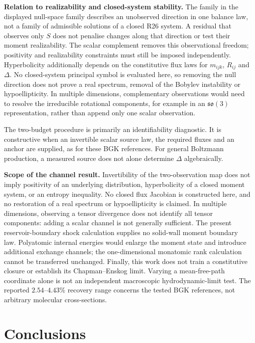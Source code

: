 \documentclass[lineno,paper]{JFM-FLM_Au}
\newenvironment{revision}{\begingroup\colorlet{shadecolor}{revisionyellow}\begin{shaded}}{\end{shaded}\endgroup}
\newenvironment{revision}{}{}
\begin{document}
\begin{revision}
\textbf{Relation to realizability and closed-system stability.} The family in the displayed null-space family describes an unobserved direction in one balance law, not a family of admissible solutions of a closed R26 system. A residual that observes only $S$ does not penalise changes along that direction or test their moment realizability. The scalar complement removes this observational freedom; positivity and realizability constraints must still be imposed independently. Hyperbolicity additionally depends on the constitutive flux laws for $m_{ijk}$, $R_{ij}$ and $\Delta$. No closed-system principal symbol is evaluated here, so removing the null direction does not prove a real spectrum, removal of the Bobylev instability or hypoellipticity. In multiple dimensions, complementary observations would need to resolve the irreducible rotational components, for example in an $\mathfrak{so}(3)$ representation, rather than append only one scalar observation.

The two-budget procedure is primarily an identifiability diagnostic. It is constructive when an invertible scalar source law, the required fluxes and an anchor are supplied, as for these BGK references. For general Boltzmann production, a measured source does not alone determine $\Delta$ algebraically.

\textbf{Scope of the channel result.} Invertibility of the two-observation map does not imply positivity of an underlying distribution, hyperbolicity of a closed moment system, or an entropy inequality. No closed flux Jacobian is constructed here, and no restoration of a real spectrum or hypoellipticity is claimed. In multiple dimensions, observing a tensor divergence does not identify all tensor components: adding a scalar channel is not generally sufficient. The present reservoir-boundary shock calculation supplies no solid-wall moment boundary law. Polyatomic internal energies would enlarge the moment state and introduce additional exchange channels; the one-dimensional monatomic rank calculation cannot be transferred unchanged. Finally, this work does not train a constitutive closure or establish its Chapman--Enskog limit. Varying a mean-free-path coordinate alone is not an independent macroscopic hydrodynamic-limit test. The reported $2.54$--$4.43\%$ recovery range concerns the tested BGK references, not arbitrary molecular cross-sections.
\end{revision}

\section{Conclusions}
\label{sec:conclusion}
\end{document}

